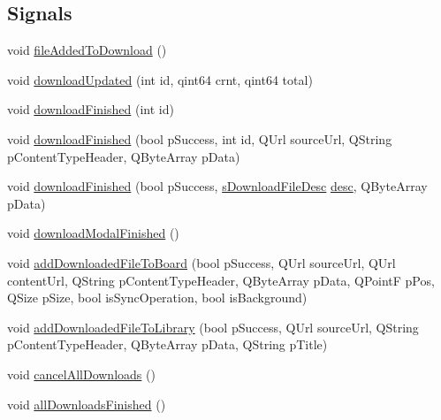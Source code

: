 \subsection*{Signals}
\begin{DoxyCompactItemize}
\item 
void \hyperlink{class_u_b_download_manager_ab6721a82bf700a33b3801f9b61356123}{file\-Added\-To\-Download} ()
\item 
void \hyperlink{class_u_b_download_manager_acf269f1cf2f15126043b4b113489c0a7}{download\-Updated} (int id, qint64 crnt, qint64 total)
\item 
void \hyperlink{class_u_b_download_manager_a12c47cd2fab70aef25ee7896ac8d5fe8}{download\-Finished} (int id)
\item 
void \hyperlink{class_u_b_download_manager_a7fa2045fc623ba3f13cf46dfb95a691f}{download\-Finished} (bool p\-Success, int id, Q\-Url source\-Url, Q\-String p\-Content\-Type\-Header, Q\-Byte\-Array p\-Data)
\item 
void \hyperlink{class_u_b_download_manager_acb9eb652ad1fa90ec3acdacf38236769}{download\-Finished} (bool p\-Success, \hyperlink{structs_download_file_desc}{s\-Download\-File\-Desc} \hyperlink{_u_b_http_get_8cpp_afde83e8a66b1328a06c071b0cc7e6f36}{desc}, Q\-Byte\-Array p\-Data)
\item 
void \hyperlink{class_u_b_download_manager_a31e9979260c22b0cf1968eea94fd5af7}{download\-Modal\-Finished} ()
\item 
void \hyperlink{class_u_b_download_manager_a7211a4b322171a3d7e714a29ca527432}{add\-Downloaded\-File\-To\-Board} (bool p\-Success, Q\-Url source\-Url, Q\-Url content\-Url, Q\-String p\-Content\-Type\-Header, Q\-Byte\-Array p\-Data, Q\-Point\-F p\-Pos, Q\-Size p\-Size, bool is\-Sync\-Operation, bool is\-Background)
\item 
void \hyperlink{class_u_b_download_manager_a516812f4416db050a3123d91c367bee4}{add\-Downloaded\-File\-To\-Library} (bool p\-Success, Q\-Url source\-Url, Q\-String p\-Content\-Type\-Header, Q\-Byte\-Array p\-Data, Q\-String p\-Title)
\item 
void \hyperlink{class_u_b_download_manager_a8502451de115dfa70d3ca1fad017e4cc}{cancel\-All\-Downloads} ()
\item 
void \hyperlink{class_u_b_download_manager_ad035f13a1abac13e2f9aa847036bac5f}{all\-Downloads\-Finished} ()
\end{DoxyCompactItemize}
